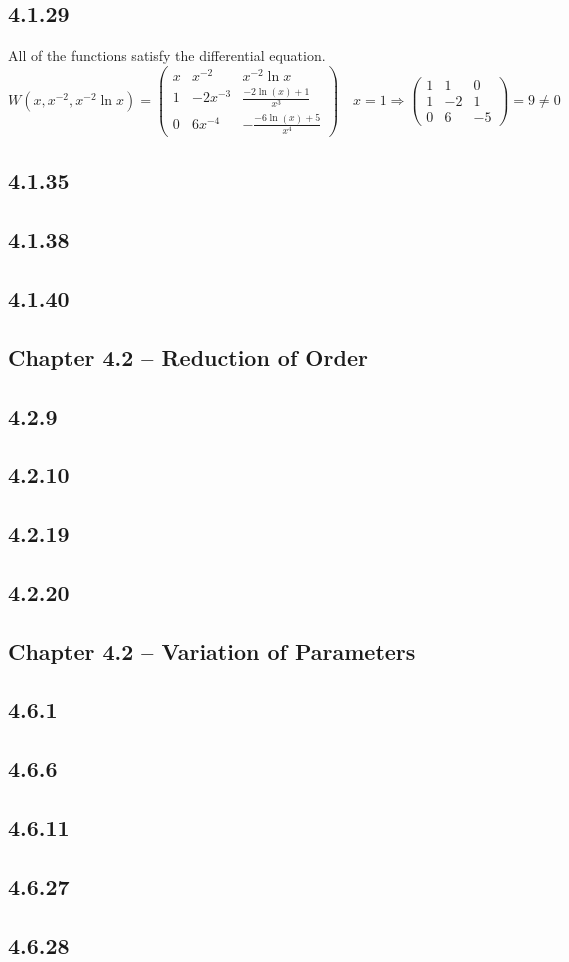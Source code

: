 \documentclass{article}
\begin{document}
\subsection{4.1.29}
All of the functions satisfy the differential equation.
\[
    W(x,x^{-2},x^{-2}\ln x)=\begin{pmatrix}x&x^{-2}&x^{-2}\ln x\\1&-2x^{-3}&\frac{-2 \ln (x) +1}{x^3}\\0 & 6x^{-4} & -\frac{-6 \ln (x)+5}{x^4}\end{pmatrix} \quad x=1 \Rightarrow \begin{pmatrix}1&1&0\\1&-2&1\\0 & 6 & -5\end{pmatrix}=9 \neq 0
\]

\subsection{4.1.35}
\subsection{4.1.38}
\subsection{4.1.40}

    
\subsection{Chapter 4.2 -- Reduction of Order}

\subsection{4.2.9}
\subsection{4.2.10}
\subsection{4.2.19}
\subsection{4.2.20}

\subsection{Chapter 4.2 -- Variation of Parameters}

\subsection{4.6.1}
\subsection{4.6.6}
\subsection{4.6.11}
\subsection{4.6.27}
\subsection{4.6.28}
\end{document}
